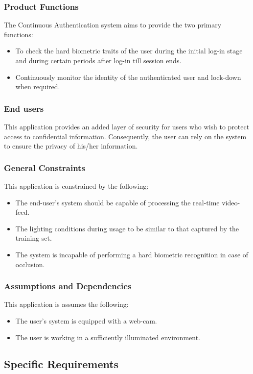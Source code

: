 \documentclass[12pt]{article}			%
\begin{document}
\subsubsection{ Product Functions }
The Continuous Authentication system aims to provide the two primary functions:
\begin{itemize}
	\item To check the hard biometric traits of the user during the initial log-in stage and during certain periods after log-in till session ends.
	\item Continuously monitor the identity of the authenticated user and lock-down when required.
\end{itemize}

\subsubsection{ End users }
This application provides an added layer of security for users who wish to protect access to confidential information. Consequently, the user can rely on the system to ensure the privacy of his/her information.

\subsubsection{ General Constraints }
This application is constrained by the following:
\begin{itemize}
	\item The end-user's system should be capable of processing the real-time video-feed.
	\item The lighting conditions during usage to be similar to that captured by the training set.
	\item The system is incapable of performing a hard biometric recognition in case of occlusion.
\end{itemize}

\subsubsection{ Assumptions and Dependencies }
This application is assumes the following:
\begin{itemize}
	\item The user's system is equipped with a web-cam.
	\item The user is working in a sufficiently illuminated environment.
\end{itemize}

\subsection{ Specific Requirements }
\end{document}
